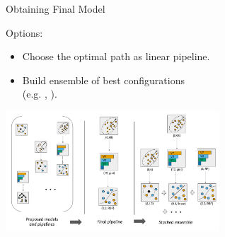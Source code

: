 	\begin{frame}{Obtaining Final Model}
		
		Options:
		\begin{itemize}
			\item Choose the optimal path as linear pipeline.
			\item Build ensemble of best configurations\\ 
			(e.g. , ).
			
		\end{itemize}
		\begin{center}
			\includegraphics[width = 0.60\textwidth]{images/stacking.pdf}
		\end{center}
		
	\end{frame}
	
